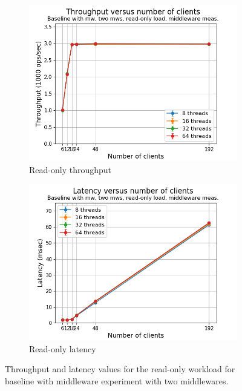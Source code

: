 \documentclass[11pt,a4paper]{article}
\begin{document}
\begin{figure}[h]
\centering
\begin{subfigure}{.5\textwidth}
  \centering
  \includegraphics[width=1.0\linewidth,trim={5px 0px 20px 0px},clip]{img/plot/mwb2-ro-tp_mw.png}
  \caption{Read-only throughput}
  \label{fig:mwb2-ro-tp_mw}
\end{subfigure}%
\begin{subfigure}{.5\textwidth}
  \centering
  \includegraphics[width=1.0\linewidth,trim={5px 0px 20px 0px},clip]{img/plot/mwb2-ro-lat_mw}
  \caption{Read-only latency}
  \label{fig:mwb2-ro-lat_mw}
\end{subfigure}
\caption{Throughput and latency values for the read-only workload for baseline with middleware experiment with two middlewares.}
\label{fig:mwb2-ro_mw}
\end{figure}
\end{document}
